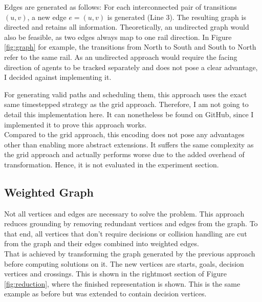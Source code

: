 \documentclass{llncs}
\begin{document}
\begin{multicols*}{2}
Edges are generated as follows: For each interconnected pair of transitions $(u,v)$, a new edge $e = (u,v)$ is generated (Line 3). The resulting graph is directed and retains all information. Theoretically, an undirected graph would also be feasible, as two edges always map to one rail direction. In Figure \ref{fig:graph} for example, the transitions from North to South and South to North refer to the same rail. As an undirected approach would require the facing direction of agents to be tracked separately and does not pose a clear advantage, I decided against implementing it.

For generating valid paths and scheduling them, this approach uses the exact same timestepped strategy as the grid approach. Therefore, I am not going to detail this implementation here. It can nonetheless be found on GitHub, since I implemented it to prove this approach works.\\

Compared to the grid approach, this encoding does not pose any advantages other than enabling more abstract extensions. It suffers the same complexity as the grid approach and actually performs worse due to the added overhead of transformation. Hence, it is not evaluated in the experiment section.

\subsection*{Weighted Graph}
\begin{figure}[t]
    
\end{figure}
\begin{figure}[b]
    
\end{figure}

Not all vertices and edges are necessary to solve the problem. This approach reduces grounding by removing redundant vertices and edges from the graph. To that end, all vertices that don't require decisions or collision handling are cut from the graph and their edges combined into weighted edges.\\

That is achieved by transforming the graph generated by the previous approach before computing solutions on it. The new vertices are starts, goals, decision vertices and crossings. This is shown in the rightmost section of Figure \ref{fig:reduction}, where the finished representation is shown. This is the same example as before but was extended to contain decision vertices.


\end{multicols*}
\end{document}
